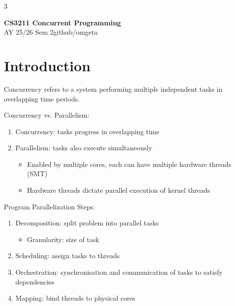 \documentclass[12pt, a4paper]{article}
\newcommand{\mytitle}{CS3211 Concurrent Programming}
\newcommand{\myauthor}{github/omgeta}
\newcommand{\mydate}{AY 25/26 Sem 2}
\begin{document}
\raggedright
\footnotesize
\begin{multicols*}{3}
\setlength{\premulticols}{1pt}
\setlength{\postmulticols}{1pt}
\setlength{\multicolsep}{1pt}
\setlength{\columnsep}{2pt}

{\normalsize{\textbf{\mytitle}}}\\
{\footnotesize{\mydate\hspace{2pt}\textemdash\hspace{2pt}\myauthor}}
\section{Introduction}
Concurrency refers to a system performing multiple independent tasks in overlapping time periods.

Concurrency vs. Parallelism:
\begin{enumerate}[\roman*.]
  \item Concurrency: tasks progress in overlapping time 
  \item Parallelism: tasks also execute simultaneously 
    \begin{itemize}[leftmargin=*]\vspace{3pt}
      \item Enabled by multiple cores, each can have multiple hardware threads (SMT) 
      \item Hardware threads dictate parallel execution of kernel threads
    \end{itemize}
\end{enumerate}

Program Parallelization Steps:
\begin{enumerate}[\roman*.]
  \item Decomposition: split problem into parallel tasks
    \begin{itemize}[leftmargin=*]\vspace{2pt}
      \item Granularity: size of task
    \end{itemize}
  \item Scheduling: assign tasks to threads
  \item Orchestration: synchronisation and communication of tasks to satisfy dependencies
  \item Mapping: bind threads to physical cores 
\end{enumerate}


\end{multicols*}
\end{document}
